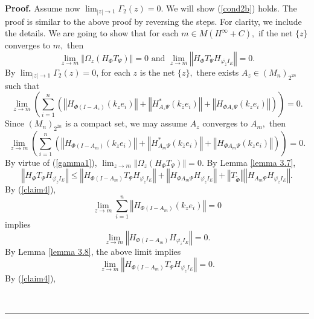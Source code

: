 \documentclass{article}%
\newenvironment{proof}[1][Proof]{\noindent\textbf{#1.} }{\ \rule{0.5em}{0.5em}}
\begin{document}
\begin{proof}
Assume now $\lim_{\left\vert z\right\vert \rightarrow1}\Gamma_{2}(z)=0.$ We
will show (\ref{cond2b}) holds. The proof is similar to the above proof by
reversing the steps. For clarity, we include the details. We are going to show
that for each $m\in M\left(  H^{\infty}+C\right)  ,$ if the net $\{z\}$
converges to $m,$ then
\[
\lim_{z\rightarrow m}\left\Vert \Omega_{z}(H_{\Phi}T_{\Psi})\right\Vert
=0\text{ and }\lim_{z\rightarrow m}\left\Vert H_{\Phi}T_{\Psi}H_{\overline
{\varphi_{\overline{z}}}I_{E}}\right\Vert =0.
\]
By $\lim_{\left\vert z\right\vert \rightarrow1}\Gamma_{2}(z)=0$, for each $z$
is the net $\{z\},$ there exists $A_{z}\in\left(  M_{n}\right)  _{2^{2n}}$
such that
\[
\lim_{z\rightarrow m}\left(  \sum_{i=1}^{n}\left(  \left\Vert H_{\Phi
(I-A_{z})}\left(  k_{z}e_{i}\right)  \right\Vert +\left\Vert H_{A_{z}\Psi
}^{\ast}\left(  k_{\overline{z}}e_{i}\right)  \right\Vert +\left\Vert H_{\Phi
A_{z}\Psi}\left(  k_{z}e_{i}\right)  \right\Vert \right)  \right)  =0.
\]
Since $\left(  M_{n}\right)  _{2^{2n}}$ is a compact set, we may assume
$A_{z}$ converges to $A_{m},$ then%
\begin{equation}
\lim_{z\rightarrow m}\left(  \sum_{i=1}^{n}\left(  \left\Vert H_{\Phi
(I-A_{m})}\left(  k_{z}e_{i}\right)  \right\Vert +\left\Vert H_{A_{m}\Psi
}^{\ast}\left(  k_{\overline{z}}e_{i}\right)  \right\Vert +\left\Vert H_{\Phi
A_{m}\Psi}\left(  k_{z}e_{i}\right)  \right\Vert \right)  \right)
=0.\label{claim4}%
\end{equation}
By virtue of (\ref{gamma1}), $\lim_{z\rightarrow m}\left\Vert \Omega
_{z}(H_{\Phi}T_{\Psi})\right\Vert =0.$ By Lemma \ref{lemma 3.7},
\begin{equation}
\left\Vert H_{\Phi}T_{\Psi}H_{\overline{\varphi_{\overline{z}}}I_{E}%
}\right\Vert \leq\left\Vert H_{\Phi(I-A_{m})}T_{\Psi}H_{\overline
{\varphi_{\overline{z}}}I_{E}}\right\Vert +\left\Vert H_{\Phi A_{m}\Psi
}H_{\overline{\varphi_{\overline{z}}}I_{E}}\right\Vert +\left\Vert
T_{\widetilde{\Phi}}\right\Vert \left\Vert H_{A_{m}\Psi}H_{\overline
{\varphi_{\overline{z}}}I_{E}}\right\Vert .\label{37a}%
\end{equation}
By (\ref{claim4}),
\[
\lim_{z\rightarrow m}\sum_{i=1}^{n}\left\Vert H_{\Phi(I-A_{m})}\left(
k_{z}e_{i}\right)  \right\Vert =0
\]
implies
\[
\lim_{z\rightarrow m}\left\Vert H_{\Phi(I-A_{m})}H_{\overline{\varphi
_{\overline{z}}}I_{E}}\right\Vert =0.
\]
By Lemma \ref{lemma 3.8}, the above limit implies
\[
\lim_{z\rightarrow m}\left\Vert H_{\Phi(I-A_{m})}T_{\Psi}H_{\overline
{\varphi_{\overline{z}}}I_{E}}\right\Vert =0.
\]
By (\ref{claim4}),

\end{proof}
\end{document}
